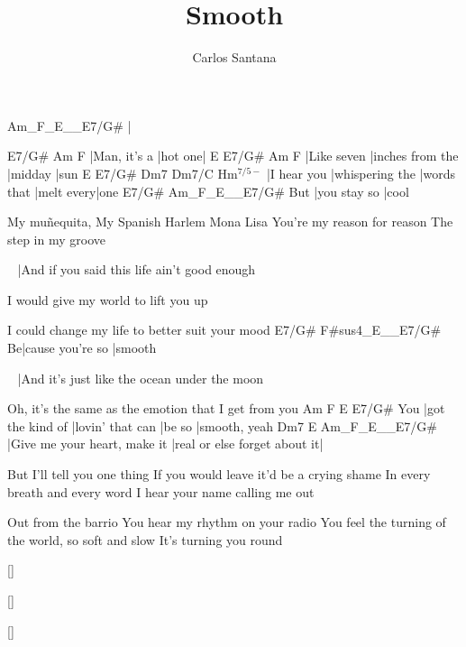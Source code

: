 \documentclass{song}
\title{Smooth}
\author{Carlos Santana}
\renewcommand{\-}{$^{7/5-}$}
\begin{document}
\strophe
Am_F_E__E7/G#
|
\endstrophe

\strophe
E7/G#        Am      F
|Man, it's a |hot one|
E           E7/G#            Am      F
|Like seven |inches from the |midday |sun
E           E7/G#           Dm7         Dm7/C      Hm\-
|I hear you |whispering the |words that |melt every|one
    E7/G#        Am_F_E__E7/G#
But |you stay so |cool
\endstrophe

\strophe*
My muñequita,
My Spanish Harlem Mona Lisa
You're my reason for reason
The step in my groove
\endstrophe

~
|And if you said this life ain't good enough

I would give my world to lift you up

I could change my life to better suit your mood
  E7/G#            F#sus4_E__E7/G#
Be|cause you're so |smooth
\endstrophe

\varrefrain
~
|And it's just like the ocean under the moon

Oh, it's the same as the emotion that I get from you
    Am               F                E      E7/G#
You |got the kind of |lovin' that can |be so |smooth, yeah
Dm7                          E                            Am_F_E__E7/G#
|Give me your heart, make it |real or else forget about it|
\endstrophe

\begin{multicols}{2}

\strophe*
But I'll tell you one thing
If you would leave it'd be a crying shame
In every breath and every word I hear your name
calling me out
\endstrophe

\strophe*
Out from the barrio
You hear my rhythm on your radio
You feel the turning of the world, so soft and slow
It's turning you round
\endstrophe

\end{multicols}


\ref{}

\ref*{}

\ref*{}



\end{document}
